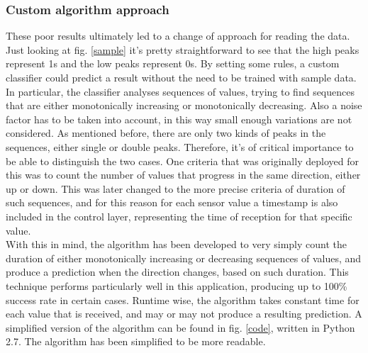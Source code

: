 \subsubsection{Custom algorithm approach}
These poor results ultimately led to a change of approach for reading the data. 
Just looking at fig. \ref{sample} it's pretty straightforward to see that the high peaks represent 1s and the low peaks represent 0s. 
By setting some rules, a custom classifier could predict a result without the need to be trained with sample data.
In particular, the classifier analyses sequences of values, trying to find sequences that are either monotonically increasing or monotonically decreasing.
Also a noise factor has to be taken into account, in this way small enough variations are not considered.
As mentioned before, there are only two kinds of peaks in the sequences, either single or double peaks.
Therefore, it's of critical importance to be able to distinguish the two cases. One criteria that was originally deployed for this was to count the number of values that progress in the same direction, either up or down. 
This was later changed to the more precise criteria of duration of such sequences, and for this reason for each sensor value a timestamp is also included in the control layer, representing the time of reception for that specific value.\\ 
With this in mind, the algorithm has been developed to very simply count the duration of either monotonically increasing or decreasing sequences of values, and produce a prediction when the direction changes, based on such duration.
This technique performs particularly well in this application, producing up to 100\% success rate in certain cases.
 Runtime wise, the algorithm takes constant time for each value that is received, and may or may not produce a resulting prediction.
A simplified version of the algorithm can be found in fig. \ref{code}, written in Python 2.7.
The algorithm has been simplified to be more readable.

